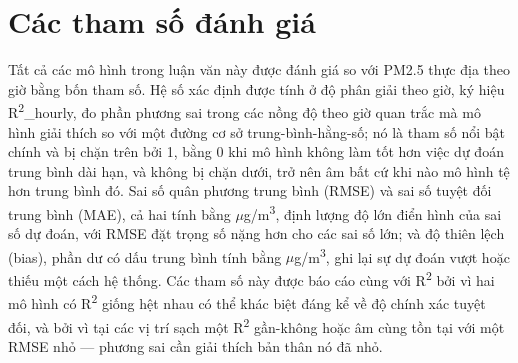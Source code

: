 \section{Các tham số đánh giá}

Tất cả các mô hình trong luận văn này được đánh giá so với PM2.5 thực địa theo giờ bằng bốn tham số. Hệ số xác định được tính ở độ phân giải theo giờ, ký hiệu R\textsuperscript{2}\_hourly, đo phần phương sai trong các nồng độ theo giờ quan trắc mà mô hình giải thích so với một đường cơ sở trung-bình-hằng-số; nó là tham số nổi bật chính và bị chặn trên bởi 1, bằng 0 khi mô hình không làm tốt hơn việc dự đoán trung bình dài hạn, và không bị chặn dưới, trở nên âm bất cứ khi nào mô hình tệ hơn trung bình đó. Sai số quân phương trung bình (RMSE) và sai số tuyệt đối trung bình (MAE), cả hai tính bằng $\mu$g/m\textsuperscript{3}, định lượng độ lớn điển hình của sai số dự đoán, với RMSE đặt trọng số nặng hơn cho các sai số lớn; và độ thiên lệch (bias), phần dư có dấu trung bình tính bằng $\mu$g/m\textsuperscript{3}, ghi lại sự dự đoán vượt hoặc thiếu một cách hệ thống. Các tham số này được báo cáo cùng với R\textsuperscript{2} bởi vì hai mô hình có R\textsuperscript{2} giống hệt nhau có thể khác biệt đáng kể về độ chính xác tuyệt đối, và bởi vì tại các vị trí sạch một R\textsuperscript{2} gần-không hoặc âm cùng tồn tại với một RMSE nhỏ --- phương sai cần giải thích bản thân nó đã nhỏ.


